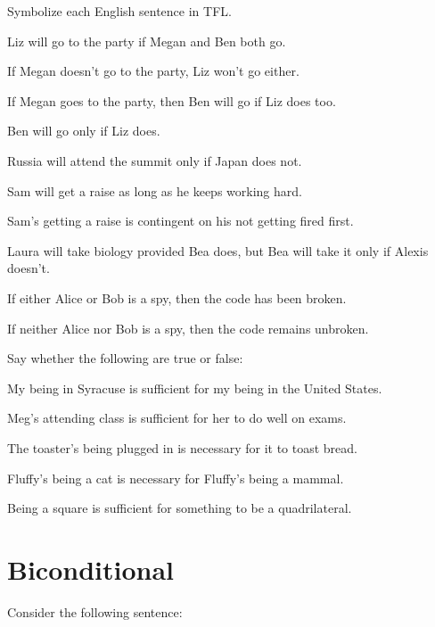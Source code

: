 \practiceproblems
\problempart Symbolize each English sentence in TFL.

\begin{earg}
\item Liz will go to the party if Megan and Ben both go.
\item If Megan doesn't go to the party, Liz won't go either.
\item If Megan goes to the party, then Ben will go if Liz does too.
\item Ben will go only if Liz does.
\item Russia will attend the summit only if Japan does not.
\item Sam will get a raise as long as he keeps working hard.
\item Sam's getting a raise is contingent on his not getting fired first.
\item Laura will take biology provided Bea does, but Bea will take it only if Alexis doesn't.
\item If either Alice or Bob is a spy, then the code has been broken.
\item If neither Alice nor Bob is a spy, then the code remains unbroken.
\end{earg}

\problempart Say whether the following are true or false:

\begin{earg}
\item My being in Syracuse is sufficient for my being in the United States.
\item Meg's attending class is sufficient for her to do well on exams.
\item The toaster's being plugged in is necessary for it to toast bread.
\item Fluffy's being a cat is necessary for Fluffy's being a mammal.
\item Being a square is sufficient for something to be a quadrilateral.
\end{earg}



\section{Biconditional}
Consider the following sentence:

